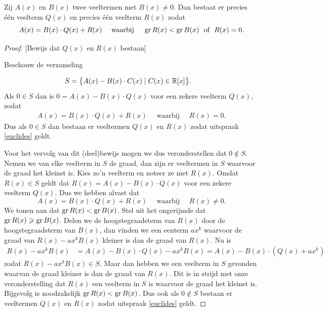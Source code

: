 \documentclass{ximera}
\begin{document}
\begin{theorem} 
Zij $A(x)$ en $B(x)$ twee veeltermen met $B(x) \neq 0$. Dan bestaat er precies \'e\'en veelterm $Q(x)$ en precies \'e\'en veelterm $R(x)$ zodat
\begin{equation} \label{euclides}
A(x) = B(x)\cdot Q(x) + R(x) \quad \text{ waarbij } \quad \operatorname{gr} R(x) < \operatorname{gr} B(x) \,\, \text{ of } \,\, R(x) = 0.
\end{equation}
\end{theorem} 
\begin{Uitbreiding}

  
\begin{proof}
  
  
  
[Bewijs dat $Q(x)$ en $R(x)$ bestaan] 
  
Beschouw de verzameling 

\begin{align*}
S & = \bigl\{ A(x) - B(x)\cdot C(x) \mid C(x) \in \mathbb{R}[x] \bigr\}.  
\end{align*}
Als $0 \in S$ dan is $0 = A(x) - B(x)\cdot Q(x)$ voor een zekere veelterm $Q(x)$, zodat \begin{align*}
A(x) = B(x)\cdot Q(x) + R(x) \quad \text{ waarbij } \quad R(x) = 0.
\end{align*}
Dus als $0 \in S$ dan bestaan er veeltermen $Q(x)$ en $R(x)$ zodat uitspraak \eqref{euclides} geldt. 

Voor het vervolg van dit (deel)bewijs mogen we dus veronderstellen dat $0 \not\in S$. Nemen we van elke veelterm in $S$ de graad, dan zijn er veeltermen in $S$ waarvoor de graad het kleinst is. Kies zo'n veelterm en noteer ze met $R(x)$. Omdat $R(x) \in S$ geldt dat $R(x) = A(x) - B(x)\cdot Q(x)$ voor een zekere veelterm $Q(x)$. Dus we hebben alvast dat
\[
A(x) = B(x)\cdot Q(x) + R(x) \quad \text{ waarbij } \quad R(x) \neq 0.
\]
We tonen aan dat $\operatorname{gr} R(x) < \operatorname{gr} B(x)$. Stel uit het ongerijmde dat $\operatorname{gr} R(x) \geqslant \operatorname{gr} B(x)$. Delen we de hoogstegraadsterm van $R(x)$ door de hoogstegraadsterm van $B(x)$, dan vinden we een eenterm $ax^k$ waarvoor de graad van $R(x) - ax^k B(x)$ kleiner is dan de graad van $R(x)$. Nu is
\begin{align*}
R(x) - ax^k B(x) & = A(x) - B(x)\cdot Q(x) - ax^k B(x) = A(x) - B(x)\cdot (Q(x) + ax^k) 
\end{align*}
zodat $R(x) - ax^k B(x) \in S$. Maar dan hebben we een veelterm in $S$ gevonden waarvan de graad kleiner is dan de graad van $R(x)$. Dit is in strijd  met onze veronderstelling dat $R(x)$ een veelterm in $S$ is waarvoor de graad het kleinst is. Bijgevolg is noodzakelijk $\operatorname{gr} R(x) < \operatorname{gr} B(x)$. Dus ook als $0 \not\in S$ bestaan er veeltermen $Q(x)$ en $R(x)$ zodat uitspraak \eqref{euclides} geldt.

\end{proof}

\end{Uitbreiding}
\end{document}
